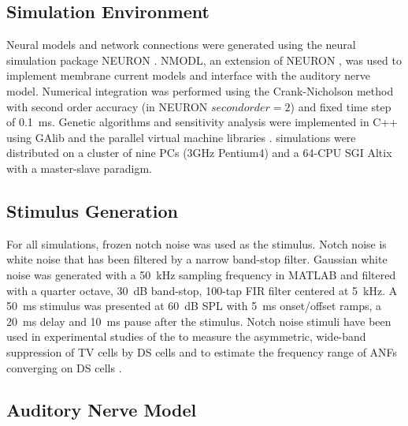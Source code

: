 \subsection{Simulation Environment}\label{sec:GA:simul-envir}

Neural models and network connections were generated using the neural
simulation package NEURON \citep{CarnevaleHines:2006}. NMODL, an
extension of NEURON \citep{HinesCarnevale:2000}, was used to implement
membrane current models and interface with the auditory nerve
model. Numerical integration was performed using the Crank-Nicholson
method with second order accuracy (in NEURON $secondorder=2$) and
fixed time step of 0.1~ms. Genetic algorithms and sensitivity analysis
were implemented in C++ using GAlib \citep{Wall:2006} and the parallel
virtual machine libraries \citep{GeistBeguelinEtAl:1994}. {\GA}
simulations were distributed on a cluster of nine PCs (3GHz Pentium4)
and a 64-CPU SGI Altix with a master-slave paradigm.

\subsection{Stimulus Generation}\label{sec:GA:stimulus-generation}

For all simulations, frozen notch noise was used as the
stimulus. Notch noise is white noise that has been filtered by a
narrow band-stop filter. Gaussian white noise was generated with a
50~kHz sampling frequency in MATLAB and filtered with a quarter
octave, 30~dB band-stop, 100-tap FIR filter centered at 5~kHz. A 50~ms
stimulus was presented at 60~dB SPL with 5~ms onset/offset ramps, a
20~ms delay and 10~ms pause after the stimulus. Notch noise stimuli
have been used in experimental studies of the {\CN} to measure the
asymmetric, wide-band suppression of TV cells by DS cells
\citep{ReissYoung:2005} and to estimate the frequency range of ANFs
converging on DS cells \citep{PalmerJiangEtAl:1996}.

\subsection{Auditory Nerve Model}\label{sec:GA:auditory-nerve-model}

